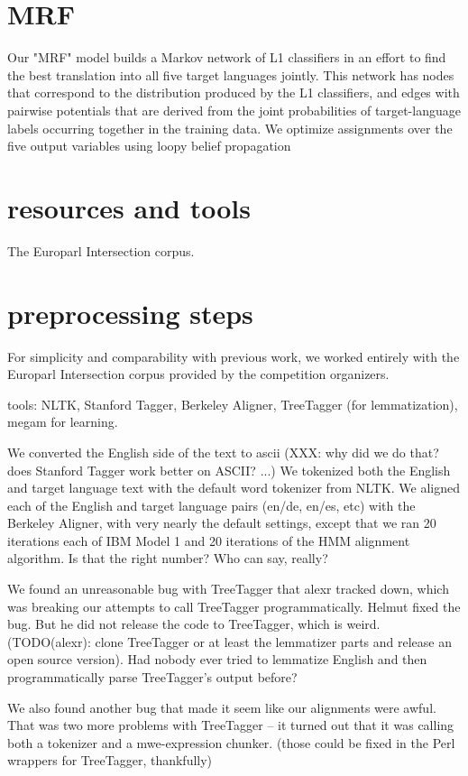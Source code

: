 \documentclass[11pt,letterpaper]{article}
\begin{document}
\section{MRF}
Our "MRF" model builds a Markov network of L1 classifiers in an effort to find
the best translation into all five target languages jointly. This network has
nodes that correspond to the distribution produced by the L1 classifiers, and
edges with pairwise potentials that are derived from the joint probabilities of
target-language labels occurring together in the training data. We optimize
assignments over the five output variables using loopy belief propagation


\section{resources and tools}
The Europarl Intersection corpus.
	

\section{preprocessing steps}
For simplicity and comparability with previous work, we worked entirely with
the Europarl Intersection corpus provided by the competition organizers.


tools: NLTK, Stanford Tagger, Berkeley Aligner, TreeTagger (for lemmatization),
megam for learning.


We converted the English side of the text to ascii (XXX: why did we do that?
does Stanford Tagger work better on ASCII? ...) We tokenized both the English
and target language text with the default word tokenizer from NLTK.  We aligned
each of the English and target language pairs (en/de, en/es, etc) with the
Berkeley Aligner, with very nearly the default settings, except that we ran 20
iterations each of IBM Model 1 and 20 iterations of the HMM alignment
algorithm. Is that the right number? Who can say, really?


We found an unreasonable bug with TreeTagger that alexr tracked down, which was
breaking our attempts to call TreeTagger programmatically. Helmut fixed the
bug. But he did not release the code to TreeTagger, which is weird.
(TODO(alexr): clone TreeTagger or at least the lemmatizer parts and release an
open source version). Had nobody ever tried to lemmatize English and then
programmatically parse TreeTagger's output before?


We also found another bug that made it seem like our alignments were awful.
That was two more problems with TreeTagger -- it turned out that it was calling
both a tokenizer and a mwe-expression chunker. (those could be fixed in the
Perl wrappers for TreeTagger, thankfully)
\end{document}
